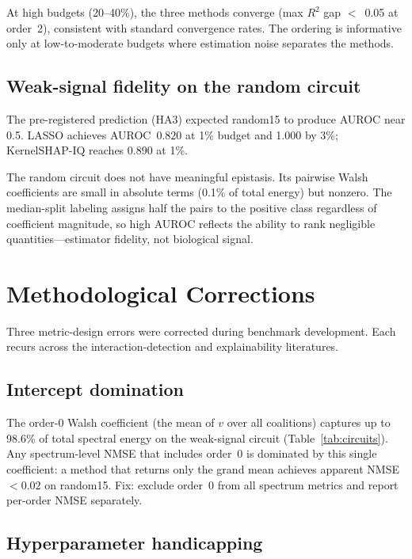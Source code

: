 \documentclass[10pt]{article}
\begin{document}
At high budgets (20--40\%), the three methods converge
(max $R^2$ gap $<$~0.05 at order~2), consistent with standard
convergence rates. The ordering is informative only at low-to-moderate
budgets where estimation noise separates the methods.


\subsection{Weak-signal fidelity on the random circuit}
\label{sec:weak-signal}

The pre-registered prediction (HA3) expected random15 to produce
AUROC near 0.5. LASSO achieves AUROC~$0.820$ at 1\% budget and
1.000 by 3\%; KernelSHAP-IQ reaches 0.890 at 1\%.

The random circuit does not have meaningful epistasis. Its pairwise
Walsh coefficients are small in absolute terms (0.1\% of total
energy) but nonzero. The median-split labeling assigns half the
pairs to the positive class regardless of coefficient magnitude,
so high AUROC reflects the ability to rank negligible
quantities---estimator fidelity, not biological signal.


\section{Methodological Corrections}
\label{sec:audit}

Three metric-design errors were corrected during benchmark
development. Each recurs across the interaction-detection and
explainability literatures.

\subsection{Intercept domination}

The order-0 Walsh coefficient (the mean of $v$ over all coalitions)
captures up to 98.6\% of total spectral energy on the weak-signal
circuit (Table~\ref{tab:circuits}). Any spectrum-level NMSE that
includes order~0 is dominated by this single coefficient: a method
that returns only the grand mean achieves apparent NMSE~$< 0.02$ on
random15. Fix: exclude order~0 from all spectrum metrics and report
per-order NMSE separately.

\subsection{Hyperparameter handicapping}
\end{document}

